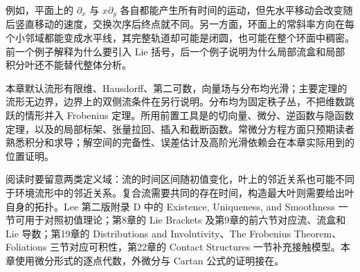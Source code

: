 \ProseParagraphBreak

例如，平面上的 \(\partial_x\) 与 \(x\partial_y\) 各自都能产生所有时间的运动，但先水平移动会改变随后竖直移动的速度，交换次序后终点就不同。另一方面，环面上的常斜率方向在每个小邻域都能变成水平线，其完整轨道却可能是闭圆，也可能在整个环面中稠密。前一个例子解释为什么要引入 Lie 括号，后一个例子说明为什么局部流盒和局部积分叶还不能替代整体分析。

\ProseParagraphBreak

本章默认流形有限维、Hausdorff、第二可数，向量场与分布均光滑；主要定理的流形无边界，边界上的双侧流条件在另行说明。分布均为固定秩子丛，不把维数跳跃的情形并入 Frobenius 定理。所用前置工具是的切向量、微分、逆函数与隐函数定理，以及的局部标架、张量拉回、插入和截断函数。常微分方程方面只预期读者熟悉积分和求导；解空间的完备性、误差估计及高阶光滑依赖会在本章实际用到的位置证明。

\ProseParagraphBreak

阅读时要留意两类定义域：流的时间区间随初值变化，叶上的邻近关系也可能不同于环境流形中的邻近关系。复合流需要共同的存在时间，构造最大叶则需要给出叶自身的拓扑。Lee 第二版附录 D 中的 Existence, Uniqueness, and Smoothness 一节可用于对照初值理论；第8章的 Lie Brackets 及第9章的前六节对应流、流盒和 Lie 导数；第19章的 Distributions and Involutivity、The Frobenius Theorem、Foliations 三节对应可积性，第22章的 Contact Structures 一节补充接触模型\cite[附录D, 第663--671页; 第8章, 第185--188页; 第9章, 第206--238页; 第19章, 第491--504页; 第22章, 第581--584页]{Lee2012Smooth}。本章使用微分形式的逐点代数，外微分与 Cartan 公式的证明接在。







